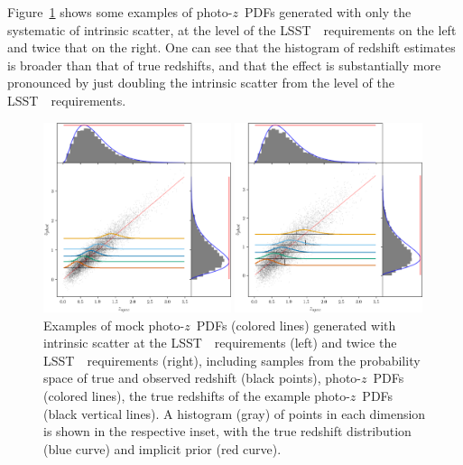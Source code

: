 \documentclass[iop]{emulateapj}
\newcommand{\Fig}[1]{Figure~\ref{#1}}
\newcommand{\project}[1]{{\textsc{#1}}~}
\newcommand{\lsst}{\project{LSST}}
\newcommand{\pz}{photo-$z$~}
\newcommand{\pzpdf}{\pz PDF}
\begin{document}
\Fig{fig:pzs-scatter} shows some examples of \pzpdf s generated with only the 
systematic of intrinsic scatter, at the level of the \lsst\ requirements on the 
left and twice that on the right.
One can see that the histogram of redshift estimates is broader than that of 
true redshifts, and that the effect is substantially more pronounced by just 
doubling the intrinsic scatter from the level of the \lsst\ requirements.

\begin{figure}
	
\includegraphics[width=0.49\textwidth]{figures/chippr/samplepzs_scatter1.png}
	
\includegraphics[width=0.49\textwidth]{figures/chippr/samplepzs_scatter2.png}
	\caption{
		Examples of mock \pzpdf s (colored lines) generated with 
intrinsic scatter at the \lsst\ requirements (left) and twice the \lsst\ 
requirements (right), including samples from the probability space of true and 
observed redshift (black points), \pzpdf s (colored lines), the true redshifts 
of the example \pzpdf s (black vertical lines).
		A histogram (gray) of points in each dimension is shown in the 
respective inset, with the true redshift distribution (blue curve) and implicit 
prior (red curve).
	}
	\label{fig:pzs-scatter}
\end{figure}
\end{document}

